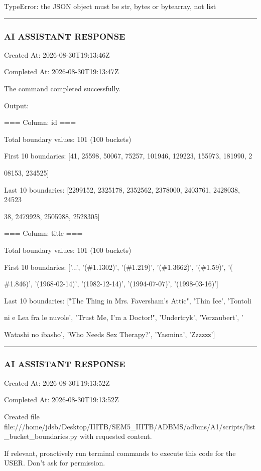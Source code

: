 \documentclass[11pt,a4paper]{article}
\begin{document}
{TypeError: the JSON object must be str, bytes or bytearray, not list


\hrule

\subsubsection{AI ASSISTANT RESPONSE}

Created At: 2026-08-30T19:13:46Z

Completed At: 2026-08-30T19:13:47Z


The command completed successfully.

Output:

=== Column: id ===

Total boundary values: 101 (100 buckets)

First 10 boundaries: [41, 25598, 50067, 75257, 101946, 129223, 155973, 181990, 2

08153, 234525]

Last 10 boundaries: [2299152, 2325178, 2352562, 2378000, 2403761, 2428038, 24523

38, 2479928, 2505988, 2528305]

=== Column: title ===

Total boundary values: 101 (100 buckets)

First 10 boundaries: ['...', '(\#1.1302)', '(\#1.219)', '(\#1.3662)', '(\#1.59)', '(

\#1.846)', '(1968-02-14)', '(1982-12-14)', '(1994-07-07)', '(1998-03-16)']

Last 10 boundaries: ["The Thing in Mrs. Faversham's Attic", 'Thin Ice', 'Tontoli

ni e Lea fra le nuvole', "Trust Me, I'm a Doctor!", 'Undertryk', 'Verzaubert', '

Watashi no ibasho', 'Who Needs Sex Therapy?', 'Yasmina', 'Zzzzzz']


\hrule

\subsubsection{AI ASSISTANT RESPONSE}

Created At: 2026-08-30T19:13:52Z

Completed At: 2026-08-30T19:13:52Z

Created file file:///home/jdsb/Desktop/IIITB/SEM5\_IIITB/ADBMS/adbms/A1/scripts/list\_bucket\_boundaries.py with requested content.

If relevant, proactively run terminal commands to execute this code for the USER. Don't ask for permission.


}
\end{document}
